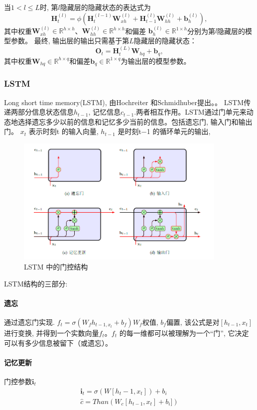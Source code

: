 \documentclass[a4paper]{article}
\begin{document}
当$1 < l \leq L$时, 第$l$隐藏层的隐藏状态的表达式为
$$\mathbf{H}_t^{(l)} = \phi(\mathbf{H}_t^{(l-1)} \mathbf{W}_{xh}^{(l)} + \mathbf{H}_{t-1}^{(l)} \mathbf{W}_{hh}^{(l)}  + \mathbf{b}_h^{(l)}), $$
其中权重$\mathbf{W}_{xh}^{(l)} \in \mathbb{R}^{h \times h}$、$\mathbf{W}_{hh}^{(l)} \in \mathbb{R}^{h \times h}$和偏差 $\mathbf{b}_h^{(l)} \in \mathbb{R}^{1 \times h}$分别为第$l$隐藏层的模型参数。
最终, 输出层的输出只需基于第$L$隐藏层的隐藏状态：
$$\mathbf{O}_t = \mathbf{H}_t^{(L)} \mathbf{W}_{hq} + \mathbf{b}_q, $$
其中权重$\mathbf{W}_{hq} \in \mathbb{R}^{h \times q}$和偏差$\mathbf{b}_q \in \mathbb{R}^{1 \times q}$为输出层的模型参数。

\subsubsection{LSTM}
Long short time memory(LSTM),  由Hochreiter 和Schmidhuber提出。\citep{HochreiterLong}。
LSTM传递两部分信息状态信息$h_{t-1}$, 记忆信息$c_{t-1}$.两者相互作用。LSTM通过门单元来动态地选择遗忘多少以前的信息和记忆多少当前的信息。包括遗忘门, 输入门和输出门。
$x_t$ 表示时刻t 的输入向量, $h_{t−1}$ 是时刻t−1 的循环单元的输出, 
\begin{figure}[!htb]
    \center
\includegraphics[width=0.9\textwidth]{LSTM.png}
\caption{LSTM 中的门控结构}
\end{figure}
LSTM结构的三部分:
\paragraph{遗忘} 通过遗忘门实现.
$f_t=\sigma (W_f h_{t-1, x_t}+b_f)$$ W_f $权值, $b_f$偏置, 该公式是对$[h_{t−1}, x_t]$ 进行变换, 并得到一个实数向量$f_t$。$f_t$ 的每一维都可以被理解为一个“门”, 它决定可以有多少信息被留下（或遗忘）。

\paragraph{记忆更新}
门控参数$\mathbf{i}_t$
\begin{align*}
    \mathbf{i}_t=\sigma(W[h_t-1, x_t])+b_i \\
    \hat{c}=Than(W_c[h_{t-1}, x_t]+b_i])
    \end{align*}
\end{document}
